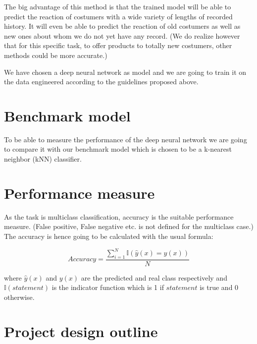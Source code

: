 \documentclass[10pt,oneside,a4paper]{report}
\begin{document}
The big advantage of this method is that the trained model will be able to predict the reaction of costumers with a wide variety of lengths of recorded history. It will even be able to predict the reaction of old costumers as well as new ones about whom we do not yet have any record. (We do realize however that for this specific task, to offer products to totally new costumers, other methods could be more accurate.)

We have chosen a deep neural network as model and we are going to train it on the data engineered according to the guidelines proposed above.

\section*{Benchmark model}

To be able to measure the performance of the deep neural network we are going to compare it with our benchmark model which is chosen to be a k-nearest neighbor (kNN) classifier.

\section*{Performance measure}
As the task is multiclass classification, accuracy is the suitable performance measure. (False positive, False negative etc. is not defined for the multiclass case.) The accuracy is hence going to be calculated with the usual formula:

$$Accuracy = \frac{\sum_{i=1}^{N}\mathbb{I}\left(\hat{y}(x) = y(x)\right)}{N}$$

where $\hat{y}(x)$ and $y(x)$ are the predicted and real class respectively and $\mathbb{I}(statement)$ is the indicator function which is 1 if $statement$ is true and 0 otherwise.

\section*{Project design outline}
\end{document}
